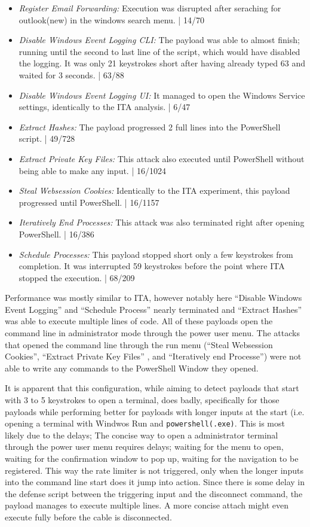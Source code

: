  \begin{itemize}
    \item  \emph{Register Email Forwarding:} Execution was disrupted after seraching for outlook(new) in the windows search menu. | 14/70
    \item  \emph{Disable Windows Event Logging CLI:} The payload was able to almost finish; running until the second to last line of the script, which would have disabled the logging. It was only 21 keystrokes short after having already typed 63 and waited for 3 seconds. | 63/88
    \item  \emph{Disable Windows Event Logging UI:}  It managed to open the Windows Service settings, identically to the ITA analysis. | 6/47
    \item  \emph{Extract Hashes:} The payload progressed 2 full lines into the PowerShell script. | 49/728
    \item  \emph{Extract Private Key Files:} This attack also executed until PowerShell without being able to make any input. | 16/1024
    \item  \emph{Steal Websession Cookies:} Identically to the ITA experiment, this payload progressed until PowerShell. | 16/1157
    \item  \emph{Iteratively End Processes:} This attack was also terminated right after opening PowerShell. | 16/386
    \item  \emph{Schedule Processes:} This payload stopped short only a few keystrokes from completion. It was interrupted 59 keystrokes before the point where ITA stopped the execution. | 68/209
\end{itemize}

Performance was mostly similar to ITA, however notably here ``Disable Windows Event Logging'' and ``Schedule Process'' nearly terminated and ``Extract Hashes'' was able to execute multiple lines of code. All of these payloads open the command line in administrator mode through the power user menu. 
The attacks that opened the command line through the run menu (``Steal Websession Cookies'', ``Extract Private Key Files'' , and ``Iteratively end Processe'')  were not able to write any commands to the PowerShell Window they opened. 

It is apparent that this configuration, while aiming to detect payloads that start with 3 to 5 keystrokes to open a terminal, does badly, specifically for those payloads while performing better for payloads with longer inputs at the start (i.e. opening a terminal with Windwos Run and \verb|powershell(.exe)|. This is most likely due to the delays; The concise way to open a administrator terminal through the power user menu requires delays; waiting for the menu to open, waiting for the confirmation window to pop up, waiting for the navigation to be registered. This way the rate limiter is not triggered, only when the longer inputs into the command line start does it jump into action. Since there is some delay in the defense script between the triggering input and the disconnect command, the payload manages to execute multiple lines.  A more concise attach might even execute fully before the cable is disconnected. 

